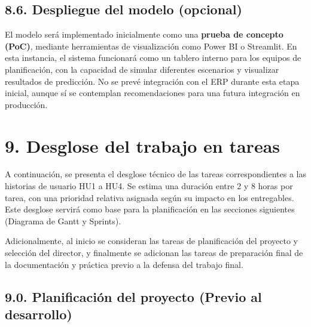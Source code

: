 \documentclass[
11pt, %
]{charter}
\begin{document}
\subsection*{8.6. Despliegue del modelo (opcional)}
El modelo será implementado inicialmente como una \textbf{prueba de concepto (PoC)}, mediante herramientas de visualización como Power BI o Streamlit. En esta instancia, el sistema funcionará como un tablero interno para los equipos de planificación, con la capacidad de simular diferentes escenarios y visualizar resultados de predicción. No se prevé integración con el ERP durante esta etapa inicial, aunque sí se contemplan recomendaciones para una futura integración en producción.


\section{9. Desglose del trabajo en tareas}
\label{sec:wbs}

A continuación, se presenta el desglose técnico de las tareas correspondientes a las historias de usuario HU1 a HU4. Se estima una duración entre 2 y 8 horas por tarea, con una prioridad relativa asignada según su impacto en los entregables. Este desglose servirá como base para la planificación en las secciones siguientes (Diagrama de Gantt y Sprints).

Adicionalmente, al inicio se consideran las tareas de planificación del proyecto y selección del director, y finalmente se adicionan las tareas de preparación final de la documentación y práctica previo a la defensa del trabajo final.

\subsection*{9.0. Planificación del proyecto (Previo al desarrollo)}
\end{document}
